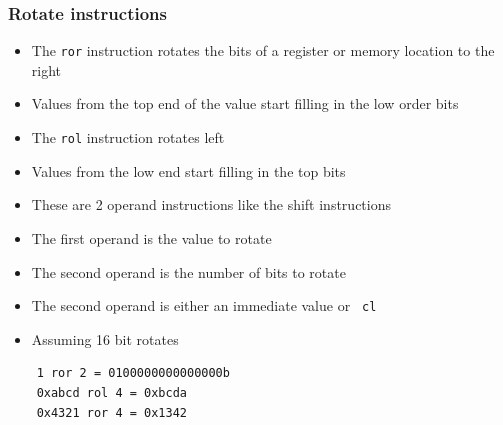 \documentclass{beamer}
\begin{document}
\begin{frame}[fragile]
    \frametitle{Rotate instructions}
    \begin{itemize}
        \item The {\tt ror} instruction rotates the bits of a register
              or memory location to the right
        \item Values from the top end of the value start filling in the
              low order bits
        \item The {\tt rol} instruction rotates left
        \item Values from the low end start filling in the top bits
        \item These are 2 operand instructions like the shift
              instructions
        \item The first operand is the value to rotate
        \item The second operand is the number of bits to rotate
        \item The second operand is either an immediate value or {\tt
              cl}
        \item Assuming 16 bit rotates
    \end{itemize}
    \begin{verbatim}
    1 ror 2 = 0100000000000000b
    0xabcd rol 4 = 0xbcda
    0x4321 ror 4 = 0x1342
    \end{verbatim}

\end{frame}
\end{document}
